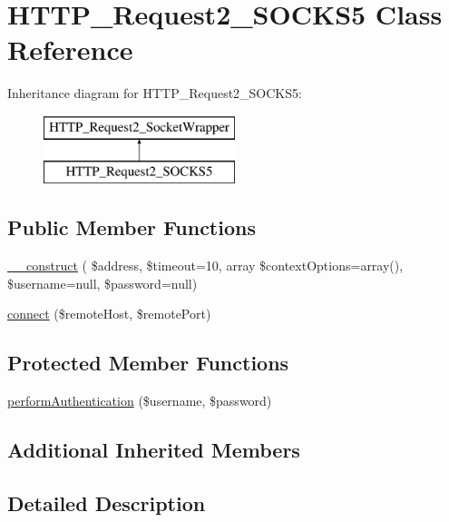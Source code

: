 \hypertarget{classHTTP__Request2__SOCKS5}{}\section{H\+T\+T\+P\+\_\+\+Request2\+\_\+\+S\+O\+C\+K\+S5 Class Reference}
\label{classHTTP__Request2__SOCKS5}
Inheritance diagram for H\+T\+T\+P\+\_\+\+Request2\+\_\+\+S\+O\+C\+K\+S5\+:\begin{figure}[H]
\begin{center}
\leavevmode
\includegraphics[height=2.000000cm]{classHTTP__Request2__SOCKS5}
\end{center}
\end{figure}
\subsection*{Public Member Functions}
\begin{DoxyCompactItemize}
\item 
\hyperlink{classHTTP__Request2__SOCKS5_a8901ef9f00626139ad0161ac73b2b9bb}{\+\_\+\+\_\+construct} ( \$address, \$timeout=10, array \$context\+Options=array(), \$username=null, \$password=null)
\item 
\hyperlink{classHTTP__Request2__SOCKS5_ace8abd1469bf004bc8b0f9edc9915d59}{connect} (\$remote\+Host, \$remote\+Port)
\end{DoxyCompactItemize}
\subsection*{Protected Member Functions}
\begin{DoxyCompactItemize}
\item 
\hyperlink{classHTTP__Request2__SOCKS5_ad01bee6f8681e480282bd055468c1dde}{perform\+Authentication} (\$username, \$password)
\end{DoxyCompactItemize}
\subsection*{Additional Inherited Members}


\subsection{Detailed Description}


